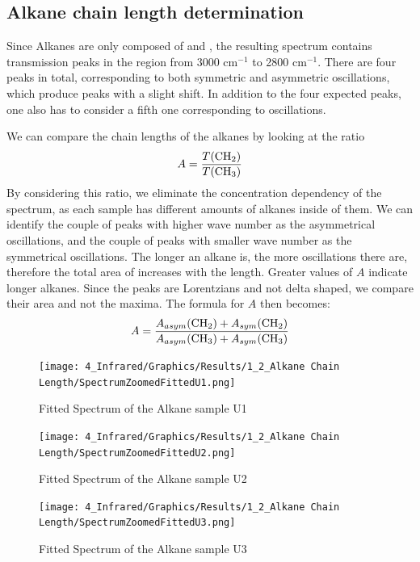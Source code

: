 \documentclass[12pt]{article}
\begin{document}
\subsection{Alkane chain length determination}

Since Alkanes are only composed of  and , the resulting spectrum contains transmission peaks in the region from 3000 cm$^{-1}$ to 2800 cm$^{-1}$. There are four peaks in total, corresponding to both symmetric and asymmetric oscillations, which produce peaks with a slight shift. In addition to the four expected peaks, one also has to consider a fifth one corresponding to  oscillations.

We can compare the chain lengths of the alkanes by looking at the ratio
\begin{equation}
    A = \frac{T(\ce{CH2})}{T(\ce{CH3})}
\end{equation}
By considering this ratio, we eliminate the concentration dependency of the spectrum, as each sample has different amounts of alkanes inside of them. We can identify the couple of peaks with higher wave number as the asymmetrical oscillations, and the couple of peaks with smaller wave number as the symmetrical oscillations. The longer an alkane is, the more  oscillations there are, therefore the total area of  increases with the length. Greater values of $A$ indicate longer alkanes. Since the peaks are Lorentzians and not delta shaped, we compare their area and not the maxima. The formula for $A$ then becomes:
\begin{equation}
    A = \frac{A_{asym}(\ce{CH2}) + A_{sym}(\ce{CH2})}{A_{asym}(\ce{CH3}) + A_{sym}(\ce{CH3})}
\end{equation}

\begin{figure}[!ht]
    \centering
    \texttt{[image: 4\_Infrared/Graphics/Results/1\_2\_Alkane Chain Length/SpectrumZoomedFittedU1.png]}
    \caption{Fitted Spectrum of the Alkane sample U1}
    \label{fig:FittedSpectrumU1}
\end{figure}
\FloatBarrier

\begin{figure}[!ht]
    \centering
    \texttt{[image: 4\_Infrared/Graphics/Results/1\_2\_Alkane Chain Length/SpectrumZoomedFittedU2.png]}
    \caption{Fitted Spectrum of the Alkane sample U2}
    \label{fig:FittedSpectrumU2}
\end{figure}
\FloatBarrier

\begin{figure}[!ht]
    \centering
    \texttt{[image: 4\_Infrared/Graphics/Results/1\_2\_Alkane Chain Length/SpectrumZoomedFittedU3.png]}
    \caption{Fitted Spectrum of the Alkane sample U3}
    \label{fig:FittedSpectrumU3}
\end{figure}
\FloatBarrier
\end{document}
